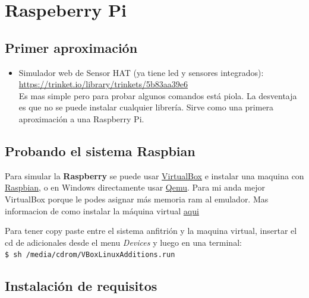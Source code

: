 \section{Raspeberry Pi}\label{raspeberry-pi}

\subsection{Primer aproximación}\label{primer-aproximacion}

\begin{itemize}
\itemsep1pt\parskip0pt
\item
  Simulador web de Sensor HAT (ya tiene led y sensores integrados):\\
  \url{https://trinket.io/library/trinkets/5b83aa39e6}\\ Es mas simple
  pero para probar algunos comandos está piola. La desventaja es que no
  se puede instalar cualquier librería. Sirve como una primera
  aproximación a una Raspberry Pi.
\end{itemize}

\subsection{Probando el sistema
\textbf{Raspbian}}\label{probando-el-sistema-raspbian}

Para simular la \textbf{Raspberry} se puede usar
\href{https://www.virtualbox.org/wiki/Downloads}{VirtualBox} e instalar
una maquina con \href{https://www.raspberrypi.org/downloads}{Raspbian},
o en Windows directamente usar
\href{https://www.qemu.org/download/}{Qemu}. Para mi anda mejor
VirtualBox porque le podes asignar más memoria ram al emulador. Mas
informacion de como instalar la máquina virtual
\href{https://thepi.io/how-to-run-raspberry-pi-desktop-on-windows-or-macos/}{aqui}

Para tener copy paste entre el sistema anfitrión y la maquina virtual,
insertar el cd de adicionales desde el menu \emph{Devices} y luego en
una terminal:\\\texttt{\$ sh /media/cdrom/VBoxLinuxAdditions.run}

\subsection{Instalación de requisitos}\label{instalacion-de-requisitos}

